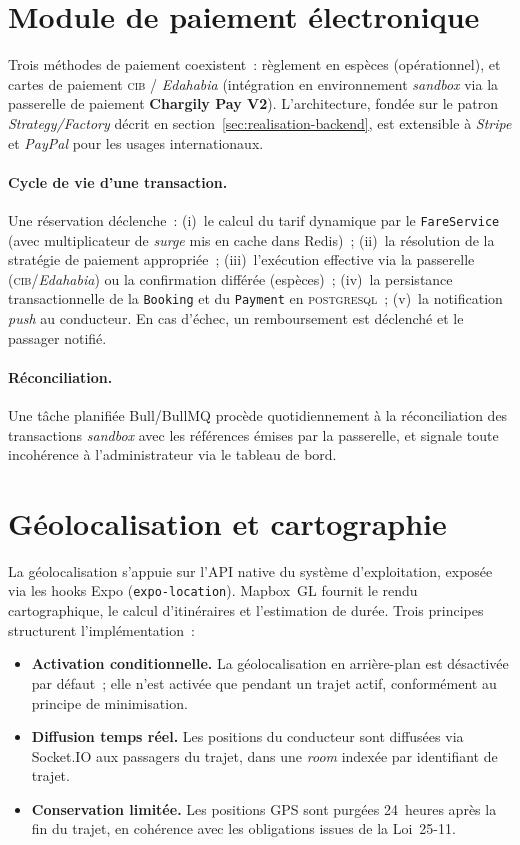 \documentclass[12pt, a4paper, oneside]{report}
\begin{document}
\section{Module de paiement électronique}
\label{sec:realisation-paiement}

Trois méthodes de paiement coexistent~: règlement en espèces (opérationnel), et cartes de paiement \textsc{cib} / \textit{Edahabia} (intégration en environnement \textit{sandbox} via la passerelle de paiement \textbf{Chargily Pay V2}). L'architecture, fondée sur le patron \textit{Strategy/Factory} décrit en section~\ref{sec:realisation-backend}, est extensible à \textit{Stripe} et \textit{PayPal} pour les usages internationaux.

\paragraph{Cycle de vie d'une transaction.} Une réservation déclenche~: (i)~le calcul du tarif dynamique par le \texttt{FareService} (avec multiplicateur de \textit{surge} mis en cache dans Redis)~; (ii)~la résolution de la stratégie de paiement appropriée~; (iii)~l'exécution effective via la passerelle (\textsc{cib}/\textit{Edahabia}) ou la confirmation différée (espèces)~; (iv)~la persistance transactionnelle de la \texttt{Booking} et du \texttt{Payment} en \textsc{postgresql}~; (v)~la notification \textit{push} au conducteur. En cas d'échec, un remboursement est déclenché et le passager notifié.

\paragraph{Réconciliation.} Une tâche planifiée Bull/BullMQ procède quotidiennement à la réconciliation des transactions \textit{sandbox} avec les références émises par la passerelle, et signale toute incohérence à l'administrateur via le tableau de bord.

\section{Géolocalisation et cartographie}
\label{sec:realisation-geoloc}

La géolocalisation s'appuie sur l'API native du système d'exploitation, exposée via les hooks Expo (\texttt{expo-location}). Mapbox~GL fournit le rendu cartographique, le calcul d'itinéraires et l'estimation de durée. Trois principes structurent l'implémentation~:
\begin{itemize}
  \item \textbf{Activation conditionnelle.} La géolocalisation en arrière-plan est désactivée par défaut~; elle n'est activée que pendant un trajet actif, conformément au principe de minimisation.
  \item \textbf{Diffusion temps réel.} Les positions du conducteur sont diffusées via Socket.IO aux passagers du trajet, dans une \textit{room} indexée par identifiant de trajet.
  \item \textbf{Conservation limitée.} Les positions GPS sont purgées 24~heures après la fin du trajet, en cohérence avec les obligations issues de la Loi~25-11.
\end{itemize}
\end{document}
